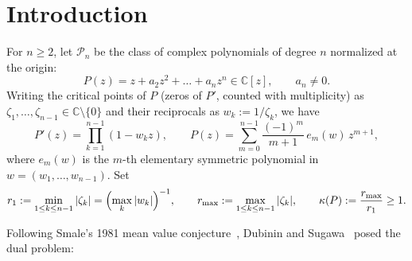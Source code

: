 \documentclass[11pt,a4paper]{article}
\theoremstyle{definition}
\theoremstyle{remark}
\newcommand{\CC}{\mathbb{C}}
\newcommand{\DD}{\mathbb{D}}
\begin{document}
\begin{abstract}
\begin{enumerate}
\item \textbf{Exact Closest-Critical-Point Non-Vanishing Threshold ($2 \le n \le 9$) and Sharpness at $n = 10$:} For every $2 \le n \le 9$ and every $P \in \mathcal{P}_n$, no closest critical point $\zeta_{j_0}$ satisfies $P(\zeta_{j_0}) = 0$ (proved via Grace--Walsh--Szeg\"o, Cayley transform, and exact rational Wall--Routh Hurwitz certificates). Conversely, at $n = 10$ there exists $w_0 \in \DD \setminus \{0\}$ (localized inside $D(1/8 - 7i/8, 1/50) \subset \DD$) such that $P'(z) = (1 - z)(1 - w_0 z)^8$ satisfies $P(1) = 0$ at its unique closest critical point $\zeta_1 = 1$.
\item \textbf{Exact Jacobi--Christoffel--Darboux Univalent Obstruction Family:} For every even degree $n = 2k \ge 2$, we construct explicit polynomials $P_k \in \mathcal{P}_{2k}$ via orthogonal Jacobi-$(0,1)$ polynomials satisfying $P_k'(x) = (1 - x) Q_k(x)^2 \ge 0$ on $[0, 1]$, $P_k'(0) = 1$, $P_k'(1) = 0$, and the exact identity
\[
P_k(1) = \int_0^1 (1 - x) Q_k(x)^2\, dx = \frac{1}{k(k + 1)} = \frac{4}{n(n + 2)},
\]
quantifying precisely why single-component univalent disk bounds face a $\Theta(1/n^2)$ barrier.
\end{enumerate}
\end{abstract}

\section{Introduction}

For $n \ge 2$, let $\mathcal{P}_n$ be the class of complex polynomials of degree $n$ normalized at the origin:
\[
P(z) = z + a_2 z^2 + \dots + a_n z^n \in \CC[z], \qquad a_n \neq 0.
\]
Writing the critical points of $P$ (zeros of $P'$, counted with multiplicity) as $\zeta_1, \dots, \zeta_{n-1} \in \CC \setminus \{0\}$ and their reciprocals as $w_k := 1/\zeta_k$, we have
\begin{equation}
\label{eq:poly-from-w}
P'(z) = \prod_{k=1}^{n-1} (1 - w_k z), \qquad P(z) = \sum_{m=0}^{n-1} \frac{(-1)^m}{m + 1}\, e_m(w)\, z^{m+1},
\end{equation}
where $e_m(w)$ is the $m$-th elementary symmetric polynomial in $w = (w_1, \dots, w_{n-1})$. Set
\[
r_1 := \min_{1 \le k \le n-1} |\zeta_k| = \Bigl(\max_k |w_k|\Bigr)^{-1}, \qquad r_{\max} := \max_{1 \le k \le n-1} |\zeta_k|, \qquad \kappa(P) := \frac{r_{\max}}{r_1} \ge 1.
\]

Following Smale's 1981 mean value conjecture~\cite{Smale1981}, Dubinin and Sugawa~\cite{DubininSugawa2009} posed the dual problem:
\end{document}
